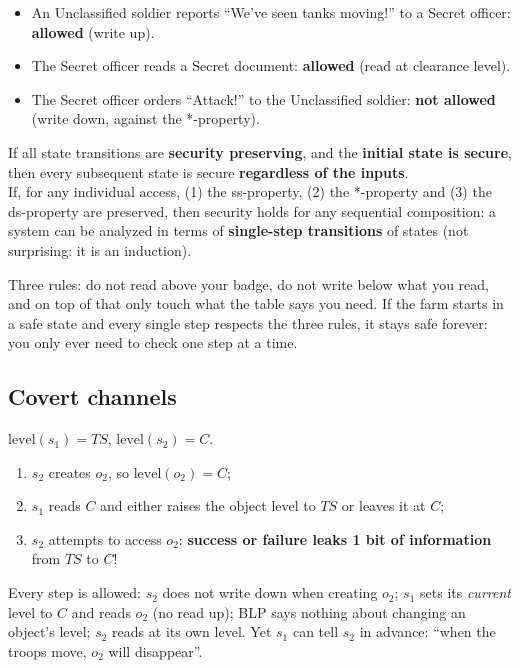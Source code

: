 \begin{exbox}[title=BLP in the army]
\begin{itemize}
  \item An Unclassified soldier reports ``We've seen tanks moving!'' to a Secret
        officer: \textbf{allowed} (write up).
  \item The Secret officer reads a Secret document: \textbf{allowed} (read at clearance
        level).
  \item The Secret officer orders ``Attack!'' to the Unclassified soldier: \textbf{not
        allowed} (write down, against the *-property).
\end{itemize}
\end{exbox}

\begin{thmbox}[title=Basic Security Theorem]
If all state transitions are \textbf{security preserving}, and the \textbf{initial state
is secure}, then every subsequent state is secure \textbf{regardless of the inputs}. \\
If, for any individual access, (1) the ss-property, (2) the *-property and (3) the
ds-property are preserved, then security holds for any sequential composition: a
system can be analyzed in terms of \textbf{single-step transitions} of states (not
surprising: it is an induction).
\end{thmbox}

\begin{goatbox}
Three rules: do not read above your badge, do not write below what you read, and on top of that
only touch what the table says you need. If the farm starts in a safe state and every single
step respects the three rules, it stays safe forever: you only ever need to check one step at a
time.
\end{goatbox}

\subsection{Covert channels}

\begin{exbox}[title={What are the transitions, and what does ``read'' mean?}]
$\text{level}(s_1) = TS$, $\text{level}(s_2) = C$.
\begin{enumerate}
  \item $s_2$ creates $o_2$, so $\text{level}(o_2) = C$;
  \item $s_1$ reads $C$ and either raises the object level to $TS$ or leaves it at $C$;
  \item $s_2$ attempts to access $o_2$: \textbf{success or failure leaks 1 bit of
        information} from $TS$ to $C$!
\end{enumerate}
Every step is allowed: $s_2$ does not write down when creating $o_2$; $s_1$ sets its
\emph{current} level to $C$ and reads $o_2$ (no read up); BLP says nothing about changing an
object's level; $s_2$ reads at its own level. Yet $s_1$ can tell $s_2$ in advance: ``when the troops
move, $o_2$ will disappear''.
\end{exbox}

